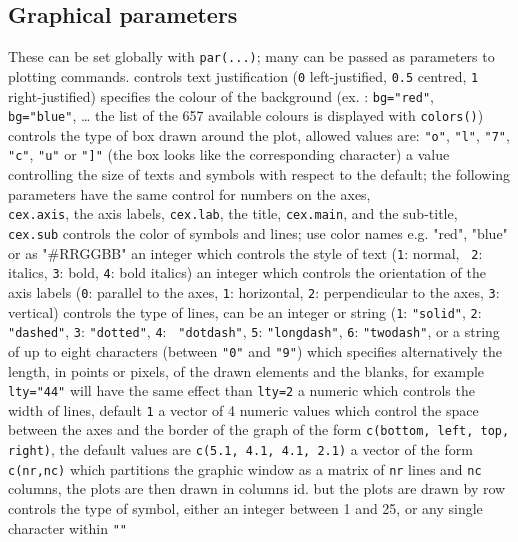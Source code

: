 \subsection{Graphical parameters}{These can be set globally with {\tt par(...)}; many can be passed as
parameters to plotting commands.}
	{controls text justification ({\tt 0} left-justified, {\tt 0.5}
centred, {\tt 1} right-justified)}
	{specifies the colour of the background (ex. : {\tt bg="red"}, {\tt
bg="blue"}, \ldots{} the list of the 657 available colours is displayed with
{\tt colors()})}
	{controls the type of box drawn around the plot, allowed values
    are: {\tt "o"}, {\tt "l"}, {\tt "7"}, {\tt "c"}, {\tt "u"} or {\tt "]"} (the box looks like the corresponding character)}
	{ a value controlling the size of texts and symbols with respect to
the default; the following parameters have the same control for numbers on the
axes,\\
    {\tt cex.axis}, the axis labels, {\tt cex.lab}, the title, {\tt cex.main},
    and the sub-title, {\tt cex.sub}}
	{controls the color of symbols and lines; use color names e.g. "red", "blue" or as "\#RRGGBB"}
	{an integer which controls the style of text ({\tt 1}: normal, {\tt
2}: italics, {\tt 3}: bold, {\tt 4}: bold italics)}
	{ an integer which controls the orientation of the axis labels ({\tt 0}: parallel to the axes, {\tt 1}: horizontal, {\tt 2}: perpendicular to the axes, {\tt 3}: vertical)}
	{controls the type of lines, can be an integer or string ({\tt 1}:
{\tt "solid"}, {\tt 2}: {\tt "dashed"}, {\tt 3}: {\tt "dotted"}, {\tt 4}: {\tt
"dotdash"}, {\tt 5}: {\tt "longdash"}, {\tt 6}: {\tt "twodash"}, or a string of
up to eight characters (between {\tt "0"} and {\tt "9"}) which specifies
alternatively the length, in points or pixels, of the drawn elements and the
blanks, for example {\tt lty="44"} will have the same effect than {\tt lty=2}}
	{ a numeric which controls the width of lines, default {\tt 1}}
	{ a vector of 4 numeric values which control the space between the
axes and the border of the graph of the form {\tt c(bottom, left, top, right)},
the default values are {\tt c(5.1, 4.1, 4.1, 2.1)}}
	{a vector of the form {\tt c(nr,nc)} which partitions the
graphic window as a matrix of {\tt nr} lines and {\tt nc} columns, the plots
are then drawn in columns}
	{ id. but the plots are drawn by row}
	{ controls the type of symbol, either an integer between 1 and 25,
or any single character within {\tt ""}}

